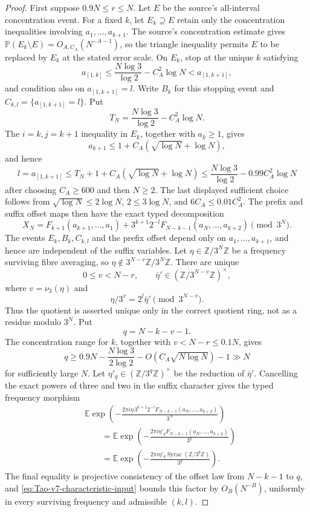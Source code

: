\begin{proof}
First suppose \(0.9N\le r\le N\).  Let \(E\) be the source's all-interval
concentration event.  For a fixed \(k\), let \(E_k\supseteq E\) retain only
the concentration inequalities involving \(a_1,\ldots,a_{k+1}\).  The source's
concentration estimate gives
\(\mathbb P(E_k\setminus E)=O_{A,C_A}(N^{-A-1})\), so the triangle
inequality permits \(E\) to be replaced by \(E_k\) at the stated error
scale.  On \(E_k\), stop at the unique \(k\) satisfying
\[
 a_{[1,k]}\le \frac{N\log3}{\log2}-C_A^2\log N
 <a_{[1,k+1]},
\]
and condition also on \(a_{[1,k+1]}=l\).  Write \(B_k\) for this stopping
event and \(C_{k,l}=\{a_{[1,k+1]}=l\}\).  Put
\[
 T_N=\frac{N\log3}{\log2}-C_A^2\log N.
\]
The \(i=k,j=k+1\) inequality in \(E_k\), together with \(a_k\ge1\), gives
\[
 a_{k+1}\le1+C_A(\sqrt{\log N}+\log N),
\]
and hence
\begin{equation}
\label{eq:Tao-v7-point99-window}
 l=a_{[1,k+1]}
 \le T_N+1+C_A(\sqrt{\log N}+\log N)
 \le\frac{N\log3}{\log2}-0.99C_A^2\log N
\end{equation}
after choosing \(C_A\ge600\) and then \(N\ge2\).  The last displayed
sufficient choice follows from
\(\sqrt{\log N}\le2\log N\), \(2\le3\log N\), and
\(6C_A\le0.01C_A^2\).  The prefix and suffix offset maps then have the
exact typed decomposition
\[
 X_N=F_{k+1}(a_{k+1},\ldots,a_1)
 +3^{k+1}2^{-l}F_{N-k-1}(a_N,\ldots,a_{k+2})
 \pmod{3^N}.
\]
The events \(E_k,B_k,C_{k,l}\) and the prefix offset depend only on
\(a_1,\ldots,a_{k+1}\), and hence are independent of the suffix variables.
Let
\(\eta\in\mathbb Z/3^N\mathbb Z\) be a frequency surviving fibre averaging,
 so \(\eta\notin3^{N-r}\mathbb Z/3^N\mathbb Z\).  There are unique
\[
 0\le v<N-r,
 \qquad \bar\eta'\in(\mathbb Z/3^{N-v}\mathbb Z)^\times,
\]
where \(v=\nu_3(\eta)\) and
\[
 \eta/3^v=2^l\bar\eta'\pmod{3^{N-v}}.
\]
Thus the quotient is asserted unique only in the correct quotient ring, not
as a residue modulo \(3^N\).  Put
\[
 q=N-k-v-1.
\]
The concentration range for \(k\), together with \(v<N-r\le0.1N\), gives
\[
 q\ge0.9N-\frac{N\log3}{2\log2}
       -O(C_A\sqrt{N\log N})-1\gg N
\]
for sufficiently large \(N\).  Let
\(\eta'_q\in(\mathbb Z/3^q\mathbb Z)^\times\) be the reduction of
\(\bar\eta'\).  Cancelling the exact powers of three and two in the suffix
character gives the typed frequency morphism
\begin{align*}
 &\mathbb E\exp\left(
 -\frac{2\pi i\eta\,3^{k+1}2^{-l}
 F_{N-k-1}(a_N,\ldots,a_{k+2})}{3^N}\right)\\
 &\qquad=
 \mathbb E\exp\left(-\frac{2\pi i\eta'_q
 F_{N-k-1}(a_N,\ldots,a_{k+2})}{3^q}\right)\\
 &\qquad=
 \mathbb E\exp\left(-\frac{2\pi i\eta'_q
 \operatorname{Syrac}(\mathbb Z/3^q\mathbb Z)}{3^q}\right).
\end{align*}
The final equality is projective consistency of the offset law from
\(N-k-1\) to \(q\), and
\eqref{eq:Tao-v7-characteristic-input} bounds this factor by
\(O_B(N^{-B})\), uniformly in every surviving frequency and admissible
\((k,l)\).


\end{proof}
